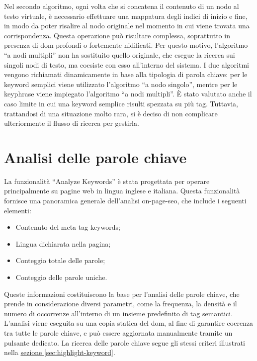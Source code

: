 \vspace{10pt}
\par\noindent Nel secondo algoritmo, ogni volta che si concatena il contenuto di un nodo al testo virtuale, è necessario effettuare una mappatura degli indici di inizio e fine, in modo da poter risalire al nodo originale nel momento in cui viene trovata una corrispondenza. Questa operazione può risultare complessa, soprattutto in presenza di \gls{dom} profondi o fortemente nidificati. Per questo motivo, l’algoritmo “a nodi multipli” non ha sostituito quello originale, che esegue la ricerca sui singoli nodi di testo, ma coesiste con esso all’interno del sistema. I due algoritmi vengono richiamati dinamicamente in base alla tipologia di parola chiave: per le keyword semplici viene utilizzato l’algoritmo “a nodo singolo”, mentre per le keyphrase viene impiegato l’algoritmo “a nodi multipli”. È stato valutato anche il caso limite in cui una keyword semplice risulti spezzata su più tag. Tuttavia, trattandosi di una situazione molto rara, si è deciso di non complicare ulteriormente il flusso di ricerca per gestirla.

\section{Analisi delle parole chiave}
\label{sec:analyze-keyword}

\par La funzionalità “Analyze Keywords” è stata progettata per operare principalmente su pagine web in lingua inglese e italiana. Questa funzionalità fornisce una panoramica generale dell'analisi \gls{on-page-seo}, che include i seguenti elementi:
\begin{itemize}
  \item Contenuto del meta tag keywords;
  \item Lingua dichiarata nella pagina;
  \item Conteggio totale delle parole;
  \item Conteggio delle parole uniche.
\end{itemize}

\vspace{10pt}
\par\noindent Queste informazioni costituiscono la base per l'analisi delle parole chiave, che prende in considerazione diversi parametri, come la frequenza, la densità e il numero di occorrenze all’interno di un insieme predefinito di tag semantici. L'analisi viene eseguita su una copia statica del \gls{dom}, al fine di garantire coerenza tra tutte le parole chiave, e può essere aggiornata manualmente tramite un pulsante dedicato. La ricerca delle parole chiave segue gli stessi criteri illustrati nella \hyperref[sec:highlight-keyword]{sezione \textsection\ref*{sec:highlight-keyword}}.

